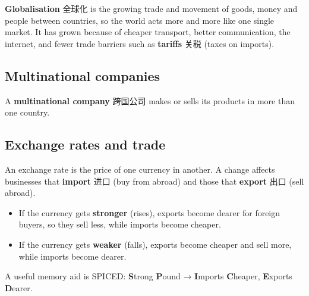 \documentclass[11pt]{article}
\begin{document}
\textbf{Globalisation} 全球化 is the growing trade and movement of goods, money and people between countries, so the world acts more and more like one single market. It has grown because of cheaper transport, better communication, the internet, and fewer trade barriers such as \textbf{tariffs} 关税 (taxes on imports).

\subsection*{Multinational companies}

A \textbf{multinational company} 跨国公司 makes or sells its products in more than one country.

\begin{center}
\end{center}

\subsection*{Exchange rates and trade}

An exchange rate is the price of one currency in another. A change affects businesses that \textbf{import} 进口 (buy from abroad) and those that \textbf{export} 出口 (sell abroad).

\begin{itemize}
\item If the currency gets \textbf{stronger} (rises), exports become dearer for foreign buyers, so they sell less, while imports become cheaper.

\item If the currency gets \textbf{weaker} (falls), exports become cheaper and sell more, while imports become dearer.

\end{itemize}

A useful memory aid is SPICED: \textbf{S}trong \textbf{P}ound → \textbf{I}mports \textbf{C}heaper, \textbf{E}xports \textbf{D}earer.
\end{document}
